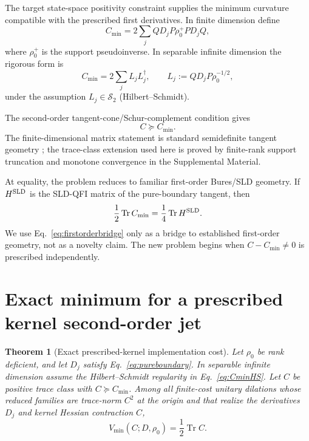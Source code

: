 \documentclass[aps,pra,preprint,nofootinbib]{revtex4-2}
\newtheorem{theorem}{Theorem}
\newcommand{\Tr}{\operatorname{Tr}}
\newcommand{\rhozero}{\rho_0}
\newcommand{\Vmin}{V_{\min}}
\newcommand{\Cmin}{C_{\min}}
\newcommand{\Cker}{C}
\begin{document}
The target state-space positivity constraint supplies the minimum curvature compatible with the prescribed first derivatives. In finite dimension define
\begin{equation}
 \Cmin
 =2\sum_j QD_jP\rhozero^+PD_jQ,
 \label{eq:Cmin}
\end{equation}
where $\rhozero^+$ is the support pseudoinverse. In separable infinite dimension the rigorous form is
\begin{equation}
 \Cmin=2\sum_j L_jL_j^\dagger,
 \qquad
 L_j:=QD_jP\rhozero^{-1/2},
 \label{eq:CminHS}
\end{equation}
under the assumption $L_j\in\mathcal S_2$ (Hilbert--Schmidt).

The second-order tangent-cone/Schur-complement condition gives
\begin{equation}
 \boxed{\Cker\succeq\Cmin.}
 \label{eq:feasible}
\end{equation}
The finite-dimensional matrix statement is standard semidefinite tangent geometry \cite{Shapiro1997,BonnansCominettiShapiro1999}; the trace-class extension used here is proved by finite-rank support truncation and monotone convergence in the Supplemental Material.

At equality, the problem reduces to familiar first-order Bures/SLD geometry. If $H^{\rm SLD}$ is the SLD-QFI matrix of the pure-boundary tangent, then
\begin{equation}
 \frac12\Tr\Cmin=\frac14\Tr H^{\rm SLD}.
 \label{eq:firstorderbridge}
\end{equation}
We use Eq.~\eqref{eq:firstorderbridge} only as a bridge to established first-order geometry, not as a novelty claim. The new problem begins when $\Cker-\Cmin\ne0$ is prescribed independently.

\section{Exact minimum for a prescribed kernel second-order jet}

\begin{theorem}[Exact prescribed-kernel implementation cost]
\label{thm:central}
Let $\rhozero$ be rank deficient, and let $D_j$ satisfy Eq.~\eqref{eq:pureboundary}. In separable infinite dimension assume the Hilbert--Schmidt regularity in Eq.~\eqref{eq:CminHS}. Let $\Cker$ be positive trace class with $\Cker\succeq\Cmin$. Among all finite-cost unitary dilations whose reduced families are trace-norm $C^2$ at the origin and that realize the derivatives $D_j$ and kernel Hessian contraction $\Cker$,
\begin{equation}
 \boxed{
 \Vmin(\Cker;D,\rhozero)
 =\frac12\Tr\Cker.
 }
 \label{eq:central}
\end{equation}
\end{theorem}
\end{document}
